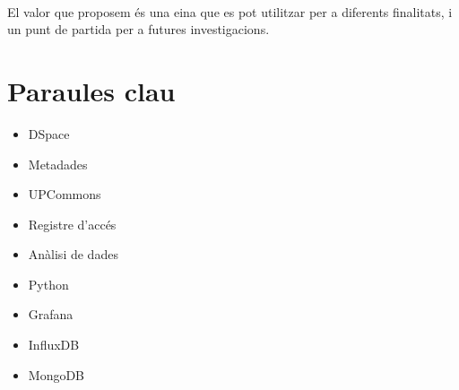 \noindent \\
El valor que proposem és una eina que es pot utilitzar per a diferents finalitats, i un punt de partida per a futures investigacions.

\clearpage
\section*{Paraules clau}\label{sec:keywords-ca}
\begin{multicols}{3}
    \begin{itemize}
        \item DSpace
        \item Metadades
        \item UPCommons
    \end{itemize}
    \columnbreak
    \begin{itemize}
        \item Registre d’accés
        \item Anàlisi de dades
        \item Python
    \end{itemize}
    \columnbreak
    \begin{itemize}
        \item Grafana
        \item InfluxDB
        \item MongoDB
    \end{itemize}
\end{multicols}